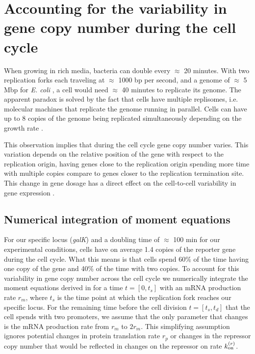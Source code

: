 \section{Accounting for the variability in gene copy number during the cell
cycle} \label{supp_multi_gene}

When growing in rich media, bacteria can double every $\approx$ 20 minutes. With
two replication forks each traveling at $\approx$ 1000 bp per second, and a
genome of $\approx$ 5 Mbp for {\it E. coli} \cite{Moran2010}, a cell would need
$\approx$ 40 minutes to replicate its genome. The apparent paradox is solved by
the fact that cells have multiple replisomes, i.e. molecular machines that
replicate the genome running in parallel. Cells can have up to 8 copies of the
genome being replicated simultaneously depending on the growth rate
\cite{Bremer1996}.

This observation implies that during the cell cycle gene copy number varies.
This variation depends on the relative position of the gene with respect to the
replication origin, having genes close to the replication origin spending more
time with multiple copies compare to genes closer to the replication termination
site. This change in gene dosage has a direct effect on the cell-to-cell
variability in gene expression \cite{Jones2014a, Peterson2015}.

\subsection{Numerical integration of moment equations}

For our specific locus ({\it galK}) and a doubling time of $\approx$ 100 min for
our experimental conditions, cells have on average 1.4 copies of the reporter
gene during the cell cycle. What this means is that cells spend 60\% of the time
having one copy of the gene and 40\% of the time with two copies. To account for
this variability in gene copy number across the cell cycle we numerically
integrate the moment equations derived in  for a time $t =
[0, t_s]$ with an mRNA production rate $r_m$, where $t_s$ is the time point at
which the replication fork reaches our specific locus. For the remaining time
before the cell division $t = [t_s, t_d]$ that the cell spends with two
promoters, we assume that the only parameter that changes is the mRNA production
rate from $r_m$ to $2 r_m$. This simplifying assumption ignores potential
changes in protein translation rate $r_p$ or changes in the repressor copy
number that would be reflected in changes on the repressor on rate $k^{(r)}_{\text{on}}$.

